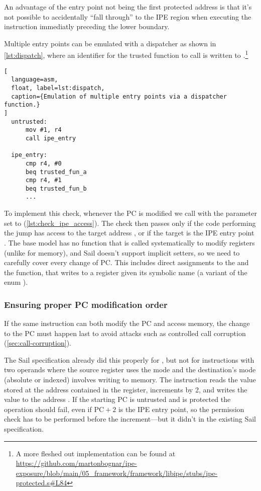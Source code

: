 An advantage of the entry point not being the first protected address is that it's not possible to accidentally ``fall through'' to the IPE region when executing the instruction immediatly preceding the lower boundary.

Multiple entry points can be emulated with a dispatcher as shown in \cref{lst:dispatch}, where an identifier for the trusted function to call is written to .\footnote{A more fleshed out implementation can be found at \url{https://github.com/martonbognar/ipe-exposure/blob/main/05_framework/framework/libipe/stubs/ipe-protected.s\#L84}}

\begin{lstlisting}[
  language=asm,
  float, label=lst:dispatch,
  caption={Emulation of multiple entry points via a dispatcher function.}
]
  untrusted:
      mov #1, r4
      call ipe_entry

  ipe_entry:
      cmp r4, #0
      beq trusted_fun_a
      cmp r4, #1
      beq trusted_fun_b
      ...
\end{lstlisting}

To implement this check, whenever the PC is modified we call  with the  parameter set to  (\cref{lst:check_ipe_access}). The check then passes only if the code performing the jump has access to the target address , or if the target is the IPE entry point . The base model has no function that is called systematically to modify registers (unlike  for memory), and Sail doesn't support implicit setters, so we need to carefully cover every change of PC. This includes direct assignments to the   and the  function, that writes to a register given its symbolic name (a variant of the enum ).

\subsubsection{Ensuring proper PC modification order}
\label{sec:pc-mod-order}

If the same instruction can both modify the PC and access memory, the change to the PC must happen last to avoid attacks such as controlled call corruption (\cref{sec:call-corruption}).

The Sail specification already did this properly for , but not for instructions with two operands where the source register uses the  mode and the destination's mode (absolute or indexed) involves writing to memory. The instruction  reads the value stored at the address contained in the  register, increments  by 2, and writes the value to the address . If the starting PC is untrusted and  is protected the operation should fail, even if \(\mathrm{PC} + 2\) is the IPE entry point, so the permission check has to be performed before the increment---but it didn't in the existing Sail specification.

